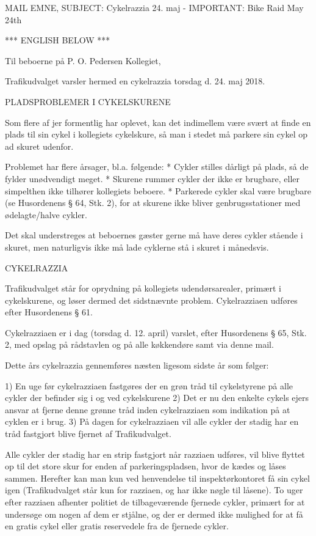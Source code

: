 MAIL EMNE, SUBJECT: Cykelrazzia 24. maj - IMPORTANT: Bike Raid May 24th

*** ENGLISH BELOW ***

Til beboerne på P. O. Pedersen Kollegiet,

Trafikudvalget varsler hermed en cykelrazzia torsdag d. 24. maj 2018.


PLADSPROBLEMER I CYKELSKURENE

Som flere af jer formentlig har oplevet, kan det indimellem være svært at finde en plads til sin cykel i kollegiets cykelskure, så man i stedet må parkere sin cykel op ad skuret udenfor.

Problemet har flere årsager, bl.a. følgende:
* Cykler stilles dårligt på plads, så de fylder unødvendigt meget.
* Skurene rummer cykler der ikke er brugbare, eller simpelthen ikke tilhører kollegiets beboere.
* Parkerede cykler skal være brugbare (se Husordenens § 64, Stk. 2), for at skurene ikke bliver genbrugsstationer med ødelagte/halve cykler.

Det skal understreges at beboernes gæster gerne må have deres cykler stående i skuret, men naturligvis ikke må lade cyklerne stå i skuret i månedsvis.


CYKELRAZZIA

Trafikudvalget står for oprydning på kollegiets udendørsarealer, primært i cykelskurene, og løser dermed det sidstnævnte problem. Cykelrazziaen udføres efter Husordenens § 61.

Cykelrazziaen er i dag (torsdag d. 12. april) varslet, efter Husordenens § 65, Stk. 2, med opslag på rådstavlen og på alle køkkendøre samt via denne mail.

Dette års cykelrazzia gennemføres næsten ligesom sidste år som følger:

1) En uge før cykelrazziaen fastgøres der en grøn tråd til cykelstyrene på alle cykler der befinder sig i og ved cykelskurene
2) Det er nu den enkelte cykels ejers ansvar at fjerne denne grønne tråd inden cykelrazziaen som indikation på at cyklen er i brug.
3) På dagen for cykelrazziaen vil alle cykler der stadig har en tråd fastgjort blive fjernet af Trafikudvalget.

Alle cykler der stadig har en strip fastgjort når razziaen udføres, vil blive flyttet op til det store skur for enden af parkeringspladsen, hvor de kædes og låses sammen. Herefter kan man kun ved henvendelse til inspektørkontoret få sin cykel igen (Trafikudvalget står kun for razziaen, og har ikke nøgle til låsene). To uger efter razziaen afhenter politiet de tilbageværende fjernede cykler, primært for at undersøge om nogen af dem er stjålne, og der er dermed ikke mulighed for at få en gratis cykel eller gratis reservedele fra de fjernede cykler.


